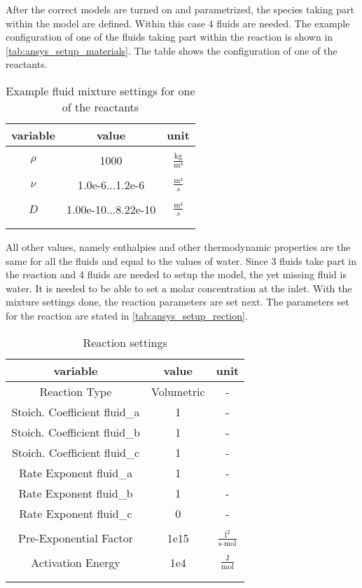 \documentclass[../thesis.tex]{subfiles}
\begin{document}
After the correct models are turned on and parametrized, the species taking part within the model are defined. Within this case 4 fluids are needed. The example configuration of one of the fluids taking part within the reaction is shown in \autoref{tab:ansys_setup_materials}. The table shows the configuration of one of the reactants.
\begin{table} [htb]
	\centering
	\caption{Example fluid mixture settings for one of the reactants}
	\begin{tabular}{ ccc }
		\hline
		variable & value & unit \\
		\hline
		\\[-1em]
		$\rho$ & 1000 & $\frac{\text{kg}}{\text{m³}}$ \\
		\\[-1em]
		$\nu$ & 1.0e-6...1.2e-6 & $\frac{\text{m²}}{s}$ \\
		\\[-1em]
		$D$ & 1.00e-10...8.22e-10 & $\frac{\text{m²}}{s}$\\
		\\[-1em]
		\hline
		\label{tab:ansys_setup_materials}
	\end{tabular}
\end{table}
All other values, namely enthalpies and other thermodynamic properties are the same for all the fluids and equal to the values of water. Since 3 fluids take part in the reaction and 4 fluids are needed to setup the model, the yet missing fluid is water. It is needed to be able to set a molar concentration at the inlet. With the mixture settings done, the reaction parameters are set next. The parameters set for the reaction are stated in \autoref{tab:ansys_setup_rection}.
\begin{table} [htb]
	\centering
	\caption{Reaction settings}
	\begin{tabular}{ ccc }
		\hline
		variable & value & unit \\
		\hline
		Reaction Type & Volumetric & - \\
		Stoich. Coefficient fluid\_a & 1 & - \\
		Stoich. Coefficient fluid\_b & 1 & - \\
		Stoich. Coefficient fluid\_c & 1 & - \\
		Rate Exponent fluid\_a & 1 & - \\
		Rate Exponent fluid\_b & 1 & - \\
		Rate Exponent fluid\_c & 0 & - \\
		\\[-1em]
		Pre-Exponential Factor & 1e15 & $\frac{\text{l}^2}{\text{s} \cdot \text{mol}}$ \\
		\\[-1em]
		Activation Energy & 1e4 & $\frac{\text{J}}{\text{mol}}$ \\
		\\[-1em]
		\hline
		\label{tab:ansys_setup_rection}
	\end{tabular}
\end{table}
\end{document}
